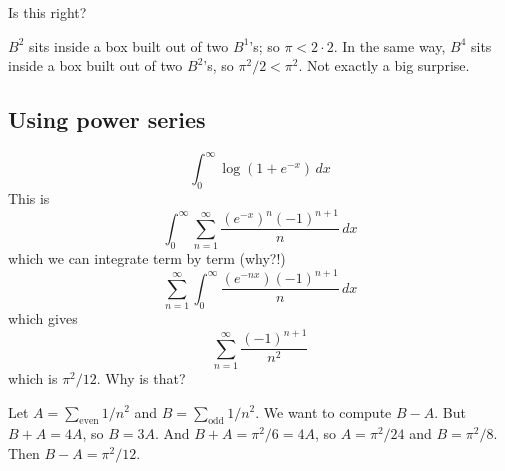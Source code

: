 \documentclass[12pt]{article}
\begin{document}
Is this right?

$B^2$ sits inside a box built out of two $B^1$'s; so $\pi < 2 \cdot
2$.  In the same way, $B^4$ sits inside a box built out of two
$B^2$'s, so $\pi^2 /2 < \pi^2$.  Not exactly a big surprise.

\subsection*{Using power series}

$$
\int_0^\infty \log (1 + e^{-x}) \, dx
$$
This is
$$
\int_0^\infty \sum_{n=1}^\infty \frac{(e^{-x})^n (-1)^{n+1} }{n} \, dx
$$
which we can integrate term by term (why?!)
$$
\sum_{n=1}^\infty \int_0^\infty \frac{(e^{-nx}) (-1)^{n+1} }{n} \, dx  
$$
which gives
$$
\sum_{n=1}^\infty \frac{ (-1)^{n+1} }{n^2}
$$
which is $\pi^2/12$.  Why is that?

Let $A = \sum_{\mbox{even}} 1/n^2$ and $B = \sum_{\mbox{odd}} 1/n^2$.
We want to compute $B - A$.  But $B + A = 4A$, so $B = 3A$.  And $B +
A = \pi^2/6 = 4A$, so $A = \pi^2/24$ and $B = \pi^2/8$.  Then $B - A =
\pi^2/12$.
\end{document}
